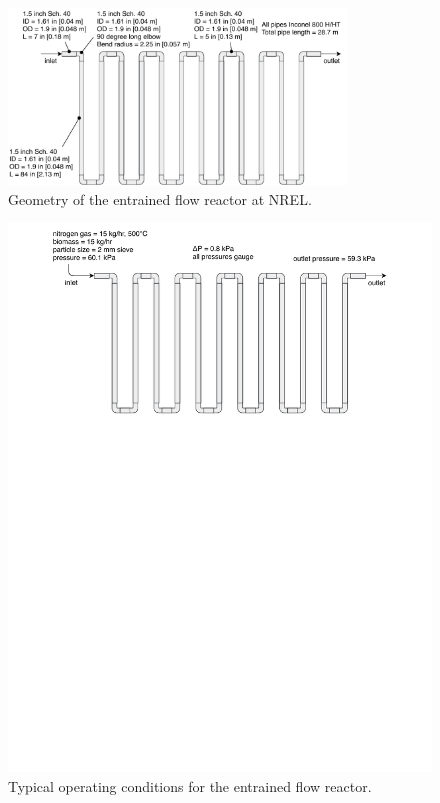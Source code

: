 \begin{figure}[!ht]
	\centering
	\includegraphics[width=0.8\textwidth]{figures/efr-geometry.pdf}
	\caption{Geometry of the entrained flow reactor at NREL.}
	\label{fig:efr-geometry}
\end{figure}

\begin{figure}[!ht]
	\centering
	\includegraphics[width=\textwidth]{figures/efr-flow.pdf}
	\caption{Typical operating conditions for the entrained flow reactor.}
	\label{fig:efr-flow}
\end{figure}

